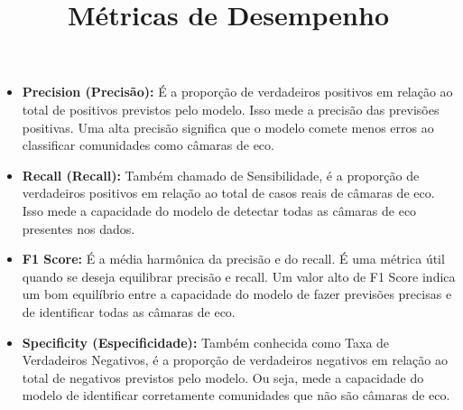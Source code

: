 \begin{itemize}
	\title{Métricas de Desempenho}
	\item \textbf{Precision (Precisão):} É a proporção de verdadeiros positivos em relação ao total de positivos previstos pelo modelo. Isso mede a precisão das previsões positivas. Uma alta precisão significa que o modelo comete menos erros ao classificar comunidades como câmaras de eco.
	\item \textbf{Recall (Recall):} Também chamado de Sensibilidade, é a proporção de verdadeiros positivos em relação ao total de casos reais de câmaras de eco. Isso mede a capacidade do modelo de detectar todas as câmaras de eco presentes nos dados.
	\item \textbf{F1 Score:} É a média harmônica da precisão e do recall. É uma métrica útil quando se deseja equilibrar precisão e recall. Um valor alto de F1 Score indica um bom equilíbrio entre a capacidade do modelo de fazer previsões precisas e de identificar todas as câmaras de eco.
	\item \textbf{Specificity (Especificidade):} Também conhecida como Taxa de Verdadeiros Negativos, é a proporção de verdadeiros negativos em relação ao total de negativos previstos pelo modelo. Ou seja, mede a capacidade do modelo de identificar corretamente comunidades que não são câmaras de eco.
\end{itemize}

